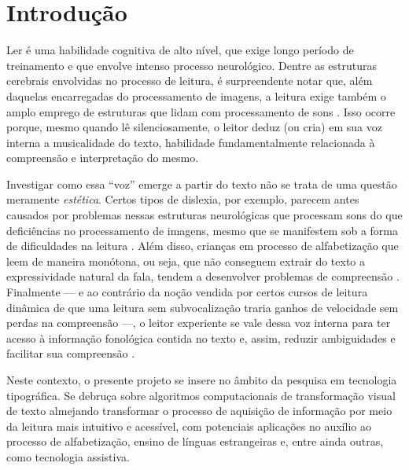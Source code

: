 \documentclass[a4paper,11pt,titlepage,singlespacing]{article}
\begin{document}
\thispagestyle{empty}
\newpage
{}


\renewcommand{\contentsname}{Sumário}
\tableofcontents

\newpage

\section{Introdução}

\noindent Ler é uma habilidade cognitiva de alto nível, que exige longo período de treinamento e que envolve intenso processo neurológico. Dentre as estruturas cerebrais envolvidas no processo de leitura, é surpreendente notar que, além daquelas encarregadas do processamento de imagens, a leitura exige também o amplo emprego de estruturas que lidam com processamento de sons \cite[cap.7]{seidenberg2017}. Isso ocorre porque, mesmo quando lê silenciosamente, o leitor deduz (ou cria) em sua voz interna a musicalidade do texto, habilidade fundamentalmente relacionada à compreensão e interpretação do mesmo.

Investigar como essa ``voz'' emerge a partir do texto não se trata de uma questão meramente \textit{estética}. Certos tipos de dislexia, por exemplo, parecem antes causados por problemas nessas estruturas neurológicas que processam sons do que deficiências no processamento de imagens, mesmo que se manifestem sob a forma de dificuldades na  leitura \cite[cap.8]{seidenberg2017}. Além disso, crianças em processo de alfabetização que leem de maneira monótona, ou seja, que não conseguem extrair do texto a expressividade natural da fala, tendem a desenvolver problemas de compreensão \cite{bessemans2017}. Finalmente — e ao contrário da noção vendida por certos cursos de leitura dinâmica de que uma leitura sem subvocalização traria ganhos de velocidade sem perdas na compreensão —, o leitor experiente se vale dessa voz interna para ter acesso à informação fonológica contida no texto e, assim, reduzir ambiguidades e facilitar sua compreensão \cite[cap.4]{seidenberg2017}.

Neste contexto, o presente projeto se insere no âmbito da pesquisa em tecnologia tipográfica. Se debruça sobre algoritmos computacionais de transformação visual de texto almejando transformar o processo de aquisição de informação por meio da leitura mais intuitivo e acessível, com potenciais aplicações no auxílio ao processo de alfabetização, ensino de línguas estrangeiras e, entre ainda outras, como tecnologia assistiva.
\end{document}

